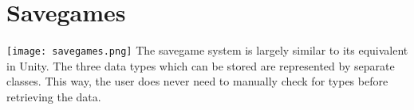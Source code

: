 \section{Savegames}
\texttt{[image: savegames.png]}
The savegame system is largely similar to its equivalent in Unity.
The three data types which can be stored are represented by separate classes.
This way, the user does never need to manually check for types before retrieving the data.
